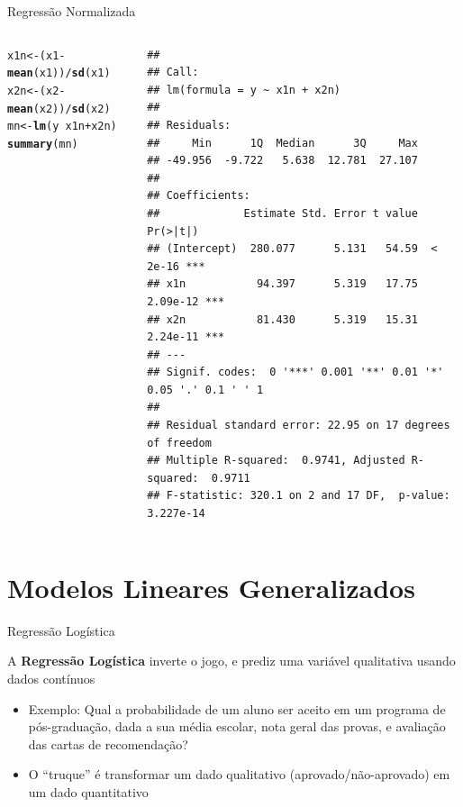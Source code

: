 \documentclass{beamer}\usepackage[]{graphicx}\usepackage[]{color}
\makeatletter
\newcommand{\hlopt}[1]{\textcolor[rgb]{0,0,0}{#1}}%
\newcommand{\hlstd}[1]{\textcolor[rgb]{0.345,0.345,0.345}{#1}}%
\newcommand{\hlkwb}[1]{\textcolor[rgb]{0.69,0.353,0.396}{#1}}%
\newcommand{\hlkwd}[1]{\textcolor[rgb]{0.737,0.353,0.396}{\textbf{#1}}}%
\newenvironment{kframe}{%
 \def\at@end@of@kframe{}%
 \ifinner\ifhmode%
  \def\at@end@of@kframe{\end{minipage}}%
  \begin{minipage}{\columnwidth}%
 \fi\fi%
 \def\FrameCommand##1{\hskip\@totalleftmargin \hskip-\fboxsep
 \colorbox{shadecolor}{##1}\hskip-\fboxsep
     \hskip-\linewidth \hskip-\@totalleftmargin \hskip\columnwidth}%
 \MakeFramed {\advance\hsize-\width
   \@totalleftmargin\z@ \linewidth\hsize
   \@setminipage}}%
 {\par\unskip\endMakeFramed%
 \at@end@of@kframe}
\newenvironment{knitrout}{}{} %
\renewenvironment{knitrout}{\setlength{\topsep}{0mm}}{}
\makeatother
\begin{document}
\begin{frame}[fragile]{Regressão Normalizada}
\begin{columns}
\setlength{\topsep}{2pt}
\begin{knitrout}\tiny
{}\color{fgcolor}\begin{kframe}
\begin{alltt}
\hlstd{x1n} \hlkwb{<-} \hlstd{(x1}\hlopt{-}\hlkwd{mean}\hlstd{(x1))}\hlopt{/}\hlkwd{sd}\hlstd{(x1)}
\hlstd{x2n} \hlkwb{<-} \hlstd{(x2}\hlopt{-}\hlkwd{mean}\hlstd{(x2))}\hlopt{/}\hlkwd{sd}\hlstd{(x2)}
\hlstd{mn} \hlkwb{<-} \hlkwd{lm}\hlstd{(y} \hlopt{~} \hlstd{x1n} \hlopt{+} \hlstd{x2n)}
\hlkwd{summary}\hlstd{(mn)}
\end{alltt}
\begin{verbatim}
## 
## Call:
## lm(formula = y ~ x1n + x2n)
## 
## Residuals:
##     Min      1Q  Median      3Q     Max 
## -49.956  -9.722   5.638  12.781  27.107 
## 
## Coefficients:
##             Estimate Std. Error t value Pr(>|t|)    
## (Intercept)  280.077      5.131   54.59  < 2e-16 ***
## x1n           94.397      5.319   17.75 2.09e-12 ***
## x2n           81.430      5.319   15.31 2.24e-11 ***
## ---
## Signif. codes:  0 '***' 0.001 '**' 0.01 '*' 0.05 '.' 0.1 ' ' 1
## 
## Residual standard error: 22.95 on 17 degrees of freedom
## Multiple R-squared:  0.9741,	Adjusted R-squared:  0.9711 
## F-statistic: 320.1 on 2 and 17 DF,  p-value: 3.227e-14
\end{verbatim}
\end{kframe}
\end{knitrout}


\end{columns}

\end{frame}

\section{Modelos Lineares Generalizados}

\begin{frame}{Regressão Logística}

A \textbf{Regressão Logística} inverte o jogo, e prediz uma variável qualitativa usando dados contínuos
\vfill
\begin{itemize}
\item Exemplo: Qual a probabilidade de um aluno ser aceito em um programa de pós-graduação, dada a sua média escolar, nota geral das provas, e avaliação das cartas de recomendação?
\vfill
\item O ``truque'' é transformar um dado qualitativo (aprovado/não-aprovado) em um dado quantitativo
\vfill
\end{itemize}

\end{frame}
\end{document}
